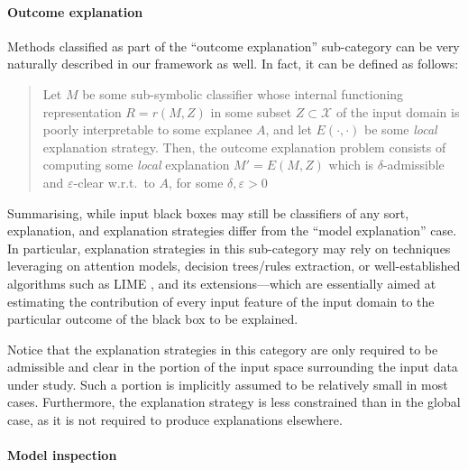 \documentclass[12pt,a4paper,openright,twoside]{book}
\begin{document}
\paragraph{Outcome explanation}

Methods classified as part of the ``outcome explanation'' sub-category can be very naturally described in our framework as well.
%
In fact, it can be defined as follows:
%
\begin{quotation}
    Let $M$ be some sub-symbolic classifier whose internal functioning representation $R = r(M, Z)$ in some subset $Z \subset \mathcal{X}$ of the input domain is poorly interpretable to some explanee $A$, and let $E(\cdot, \cdot)$ be some \emph{local} explanation strategy.
    Then, the outcome explanation problem consists of computing some \emph{local} explanation $M' = E(M, Z)$ which is $\delta$-admissible and $\varepsilon$-clear w.r.t.\ to $A$, for some $\delta, \varepsilon > 0$
\end{quotation}
%
Summarising, while input black boxes may still be classifiers of any sort, explanation, and explanation strategies differ from the ``model explanation'' case.
%
In particular, explanation strategies in this sub-category may rely on techniques leveraging on attention models, decision trees/rules extraction, or well-established algorithms such as LIME \cite{RibeiroSG16}, and its extensions---which are essentially aimed at estimating the contribution of every input feature of the input domain to the particular outcome of the black box to be explained.

Notice that the explanation strategies in this category are only required to be admissible and clear in the portion of the input space surrounding the input data under study.
%
Such a portion is implicitly assumed to be relatively small in most cases.
%
Furthermore, the explanation strategy is less constrained than in the global case, as it is not required to produce explanations elsewhere.

\paragraph{Model inspection}
\end{document}
